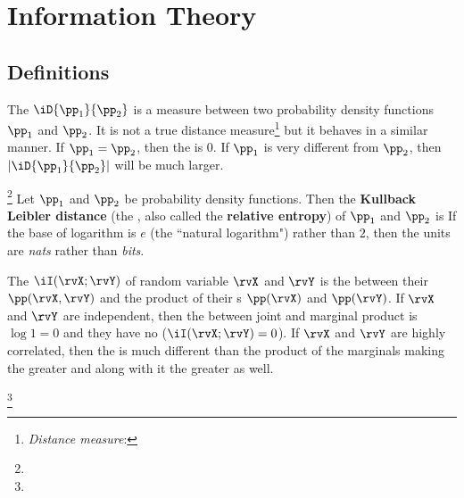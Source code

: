 \section{Information Theory}
\subsection{Definitions}
The  $\iD{\pp_1}{\pp_2}$  is a 
measure between two probability density functions $\pp_1$ and $\pp_2$.
It is not a true distance measure\footnote{
  {\em Distance measure}: 
  }
but it behaves in a similar manner.
If $\pp_1=\pp_2$, then the  is 0.
If $\pp_1$ is very different from $\pp_2$, then $|\iD{\pp_1}{\pp_2}|$ 
will be much larger.

\begin{definition}
\footnote{
  }
\label{def:kld}
Let $\pp_1$ and $\pp_2$ be probability density functions.
Then the {\bf Kullback Leibler distance}
(the , also called the {\bf relative entropy})
of $\pp_1$ and $\pp_2$ is
If the base of logarithm is $e$ (the ``natural logarithm") rather than $2$,
then the units are {\em nats} rather than {\em bits}.
\end{definition}

The  $\iI(\rvX;\rvY)$ of random variable $\rvX$ and $\rvY$ is
the  between their  $\pp(\rvX,\rvY)$ and the 
product of their s $\pp(\rvX)$ and $\pp(\rvY)$.
If $\rvX$ and $\rvY$ are independent, then the  between 
joint and marginal product is $\log1=0$ and they have no 
 ($\iI(\rvX;\rvY)=0$).
If $\rvX$ and $\rvY$ are highly correlated, then the  is
much different than the product of the marginals making the 
greater and along with it the  greater as well.
\begin{definition}
\footnote{
  }
\label{def:I(X;Y)}
\end{definition}


